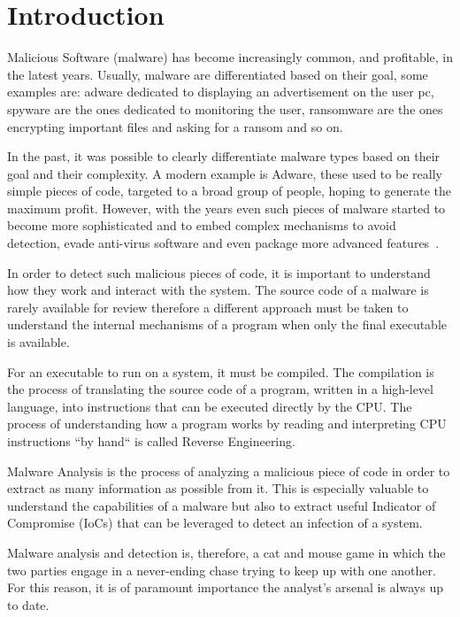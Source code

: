 \chapter{Introduction}

Malicious Software (malware) has become increasingly common, and profitable, in the latest years. Usually, malware are differentiated based on their goal, some examples are: adware dedicated to displaying an advertisement on the user pc, spyware are the ones dedicated to monitoring the user, ransomware are the ones encrypting important files and asking for a ransom and so on. 

In the past, it was possible to clearly differentiate malware types based on their goal and their complexity. A modern example is Adware, these used to be really simple pieces of code, targeted to a broad group of people, hoping to generate the maximum profit. However, with the years even such pieces of malware started to become more sophisticated and to embed complex mechanisms to avoid detection, evade anti-virus software and even package more advanced features~\cite{bitdef}.

In order to detect such malicious pieces of code, it is important to understand how they work and interact with the system. The source code of a malware is rarely available for review therefore a different approach must be taken to understand the internal mechanisms of a program when only the final executable is available. 

For an executable to run on a system, it must be compiled. The compilation is the process of translating the source code of a program, written in a high-level language, into instructions that can be executed directly by the CPU. The process of understanding how a program works by reading and interpreting CPU instructions ``by hand`` is called Reverse Engineering.

Malware Analysis is the process of analyzing a malicious piece of code in order to extract as many information as possible from it. This is especially valuable to understand the capabilities of a malware but also to extract useful Indicator of Compromise (IoCs) that can be leveraged to detect an infection of a system. 

Malware analysis and detection is, therefore, a cat and mouse game in which the two parties engage in a never-ending chase trying to keep up with one another. For this reason, it is of paramount importance the analyst's arsenal is always up to date.

